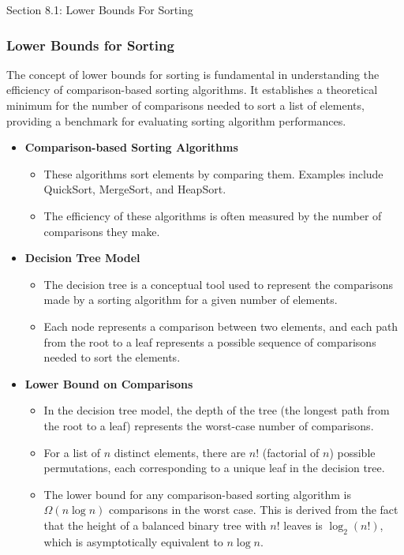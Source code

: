 \begin{notes}{Section 8.1: Lower Bounds For Sorting}
    \subsubsection*{Lower Bounds for Sorting}

    The concept of lower bounds for sorting is fundamental in understanding the efficiency of comparison-based sorting algorithms. It establishes a theoretical minimum for the number of comparisons 
    needed to sort a list of elements, providing a benchmark for evaluating sorting algorithm performances.
    
    \begin{itemize}
        \item \textbf{Comparison-based Sorting Algorithms}
        \begin{itemize}
            \item These algorithms sort elements by comparing them. Examples include QuickSort, MergeSort, and HeapSort.
            \item The efficiency of these algorithms is often measured by the number of comparisons they make.
        \end{itemize}
        
        \item \textbf{Decision Tree Model}
        \begin{itemize}
            \item The decision tree is a conceptual tool used to represent the comparisons made by a sorting algorithm for a given number of elements.
            \item Each node represents a comparison between two elements, and each path from the root to a leaf represents a possible sequence of comparisons needed to sort the elements.
        \end{itemize}
        
        \item \textbf{Lower Bound on Comparisons}
        \begin{itemize}
            \item In the decision tree model, the depth of the tree (the longest path from the root to a leaf) represents the worst-case number of comparisons.
            \item For a list of $n$ distinct elements, there are $n!$ (factorial of $n$) possible permutations, each corresponding to a unique leaf in the decision tree.
            \item The lower bound for any comparison-based sorting algorithm is $\Omega(n \log n)$ comparisons in the worst case. This is derived from the fact that the height of a balanced binary 
            tree with $n!$ leaves is $\log_2(n!)$, which is asymptotically equivalent to $n \log n$.
        \end{itemize}
    \end{itemize}
    

\end{notes}
